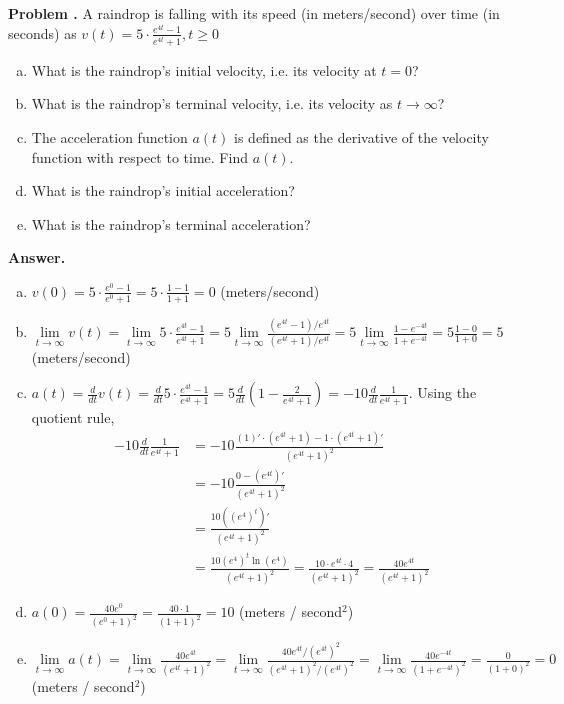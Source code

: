 \documentclass[11pt,letterpaper]{article}
\newcounter{problem}
\newcommand{\problem}{
	\stepcounter{problem}%
	\noindent \textbf{Problem \theproblem. }%
}
\newcommand{\answer}{\noindent \textbf{Answer. }}
\begin{document}
\problem A raindrop is falling with its speed (in meters/second) over time (in seconds) as $v(t) = 5\cdot \frac{e^{4t}-1}{e^{4t}+1}, t \ge 0$
\begin{enumerate}[(a)]
    \item What is the raindrop's initial velocity, i.e. its velocity at $t = 0$?
    \item What is the raindrop's terminal velocity, i.e. its velocity as $t \rightarrow \infty$?
    \item The acceleration function $a(t)$ is defined as the derivative of the velocity function with respect to time. Find $a(t)$.
    \item What is the raindrop's initial acceleration?
    \item What is the raindrop's terminal acceleration?
\end{enumerate}\vspace{6mm}

\answer
\begin{enumerate}[(a)]
    \item $v(0) = 5 \cdot \frac{e^0 - 1}{e^0 + 1} = 5 \cdot \frac{1-1}{1+1} = 0$ (meters/second)
    \item $\lim\limits_{t \to \infty} v(t) = \lim\limits_{t \to \infty} 5 \cdot \frac{e^{4t}-1}{e^{4t}+1} = 5\lim\limits_{t \to \infty} \frac{(e^{4t}-1)/e^{4t}}{(e^{4t}+1)/e^{4t}} = 5\lim\limits_{t \to \infty} \frac{1-e^{-4t}}{1+e^{-4t}} = 5 \frac{1-0}{1+0} = 5$ (meters/second)
    \item $a(t) = \frac{d}{dt} v(t) = \frac{d}{dt} 5 \cdot \frac{e^{4t}-1}{e^{4t}+1} = 5\frac{d}{dt} \left(1-\frac{2}{e^{4t}+1}\right) = -10\frac{d}{dt}\frac{1}{e^{4t}+1}$.  Using the quotient rule,
    \begin{align*}
        -10\frac{d}{dt}\frac{1}{e^{4t}+1} &= -10\frac{(1)'\cdot(e^{4t}+1) - 1 \cdot (e^{4t}+1)'}{(e^{4t}+1)^2} \\
        &= -10\frac{0-(e^{4t})'}{(e^{4t}+1)^2} \\
        &= \frac{10\left((e^4)^t\right)'}{(e^{4t}+1)^2} \\
        &= \frac{10 \left(e^4\right)^t \ln (e^4)}{(e^{4t}+1)^2} = \frac{10 \cdot e^{4t} \cdot 4}{(e^{4t}+1)^2} = \frac{40 e^{4t}}{(e^{4t}+1)^2}
    \end{align*}
    \item $a(0) = \frac{40e^0}{(e^0+1)^2} = \frac{40\cdot 1}{(1+1)^2} = 10$ (meters / second$^2$)
    \item $\lim\limits_{t \to \infty} a(t) = \lim\limits_{t \to \infty} \frac{40 e^{4t}}{(e^{4t}+1)^2} = \lim\limits_{t \to \infty} \frac{40 e^{4t} / (e^{4t})^2}{(e^{4t}+1)^2 / (e^{4t})^2} =  \lim\limits_{t \to \infty} \frac{40 e^{-4t}}{(1+e^{-4t})^2} = \frac{0}{(1+0)^2} = 0$ (meters / second$^2$)
\end{enumerate}\vspace{6mm}
\end{document}
